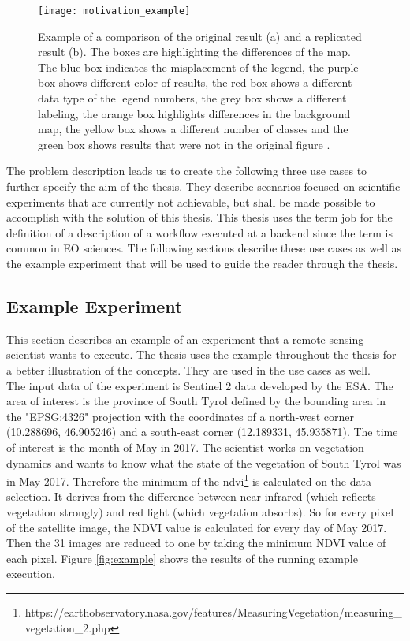 \documentclass[draft,final]{vutinfth} %
\begin{document}
\begin{figure}[h]
	\centering
	\texttt{[image: motivation\_example]}
	\caption{Example of a comparison of the original result (a) and a replicated result (b). The boxes are highlighting the differences of the map. The blue box indicates the misplacement of the legend, the purple box shows different color of results, the red box shows a different data type of the legend numbers, the grey box shows a different labeling, the orange box highlights differences in the background map, the yellow box shows a different number of classes and the green box shows results that were not in the original figure \cite{Thestateofreproducibility}.}
	\label{fig:motivation} %
\end{figure} 
\newpage
The problem description leads us to create the following three use cases to further specify the aim of the thesis. They describe scenarios focused on scientific experiments that are currently not achievable, but shall be made possible to accomplish with the solution of this thesis. This thesis uses the term \gls{job} for the definition of a description of a workflow executed at a backend since the term is common in EO sciences. The following sections describe these use cases as well as the example experiment that will be used to guide the reader through the thesis.  

\subsection{Example Experiment}\label{example}

This section describes an example of an experiment that a remote sensing scientist wants to execute. The thesis uses the example throughout the thesis for a better illustration of the concepts. They are used in the use cases as well. \\
The input data of the experiment is Sentinel 2 data developed by the ESA. The area of interest is the province of South Tyrol defined by the bounding area in the "EPSG:4326" projection with the coordinates of a north-west corner (10.288696, 46.905246) and a south-east corner (12.189331, 45.935871). The time of interest is the month of May in 2017. The scientist works on vegetation dynamics and wants to know what the state of the vegetation of South Tyrol was in May 2017. Therefore the minimum of the  \gls{ndvi}\footnote{https://earthobservatory.nasa.gov/features/MeasuringVegetation/measuring\_vegetation\_2.php} is calculated on the data selection. It derives from the difference between near-infrared (which reflects vegetation strongly) and red light (which vegetation absorbs). So for every pixel of the satellite image, the NDVI value is calculated for every day of May 2017. Then the 31 images are reduced to one by taking the minimum NDVI value of each pixel. Figure \ref{fig:example} shows the results of the running example execution.\\
\end{document}
